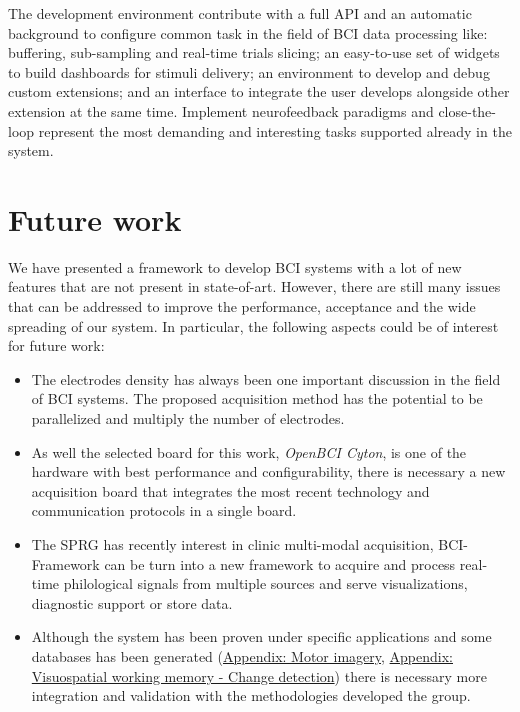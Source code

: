 The development environment contribute with a full \gls*{API} and an automatic background to configure common task in the field of \gls{BCI} data processing like: buffering, sub-sampling and real-time trials slicing; an easy-to-use set of widgets to build dashboards for stimuli delivery; an environment to develop and debug custom extensions; and an interface to integrate the user develops alongside other extension at the same time. Implement neurofeedback paradigms and close-the-loop represent the most demanding and interesting tasks supported already in the system.


\section{Future work} 

We have presented a framework to develop \gls*{BCI} systems with a lot of new features that are not present in state-of-art. However, there are still many issues that can be addressed to improve the performance, acceptance and the wide spreading of our system. In particular, the following aspects could be of interest for future work:

\begin{itemize}
    \item The electrodes density has always been one important discussion \cite{wang2016comparison, guo2020principles, liu2018detecting} in the field of \gls{BCI} systems. The proposed acquisition method has the potential to be parallelized and multiply the number of electrodes.
    
    \item As well the selected board for this work, \textit{OpenBCI Cyton}, is one of the hardware with best performance and configurability, there is necessary a new acquisition board that integrates the most recent technology and communication protocols in a single board.
    
    \item The \gls*{SPRG} has recently interest in clinic multi-modal acquisition, BCI-Framework can be turn into a new framework to acquire and process real-time philological signals from multiple sources and serve visualizations, diagnostic support or store data.
    
    \item Although the system has been proven under specific applications and some databases has been generated (\href{appendix:motor-imagery}{Appendix: Motor imagery}, \href{appendix:working_memory}{Appendix: Visuospatial working memory - Change detection}) there is necessary more integration and validation with the methodologies developed the group. 
\end{itemize}




